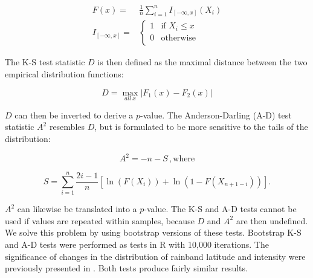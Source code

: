 \documentclass[singlecolumn,11pt]{pnas-new}
\begin{document}
\begin{align}
	F(x) =& \frac{1}{n}\sum_{i=1}^n I_{[-\infty,x]} (X_i) \\
	I_{[-\infty,x]} =& 
	\begin{cases}
   		 1 & \text{if } X_i \leq x\\
    		0 & \text{otherwise} \\
    	\end{cases}
\end{align}

 The K-S test statistic $D$ is then defined as the maximal distance between the two empirical distribution functions:

\begin{equation}
	D=\max_{all\ x} |F_{1}(x)-F_{2}(x)|
\end{equation}

$D$ can then be inverted to derive a $p$-value. The Anderson-Darling (A-D) test statistic $A^2$ resembles $D$, but is formulated to be more sensitive to the tails of the distribution:

\begin{equation}
	A^2 = -n-S \,,
	\mathrm{where}
\end{equation}

\begin{equation}
	S=\sum_{i=1}^n \frac{2i-1}{n}\left[\ln(F(X_i)) + \ln\left(1-F(X_{n+1-i})\right)\right].
\end{equation}

	$A^2$ can likewise be translated into a $p$-value. The K-S and A-D tests cannot be used if values are repeated within samples, because $D$ and $A^2$ are then undefined. We solve this problem by using bootstrap versions of these tests. Bootstrap K-S and A-D tests were performed as tests in R with 10,000 iterations. The significance of changes in the distribution of rainband latitude and intensity were previously presented in \cite{Day2016}. Both tests produce fairly similar results.
	
\clearpage

\end{document}
